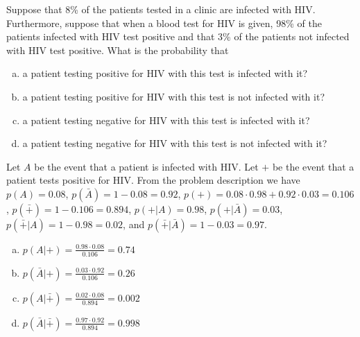 \documentclass[../main.tex]{subfiles}
\begin{document}
Suppose that 8\% of the patients tested in a clinic are infected with HIV.
Furthermore, suppose that when a blood test for HIV is given, 98\% of the patients infected with HIV test positive and that 3\% of the patients not infected with HIV test positive.
What is the probability that
\begin{enumerate}[a)]
	\item a patient testing positive for HIV with this test is infected with it?
	\item a patient testing positive for HIV with this test is not infected with it?
	\item a patient testing negative for HIV with this test is infected with it?
	\item a patient testing negative for HIV with this test is not infected with it?
\end{enumerate}

\solution
Let $A$ be the event that a patient is infected with HIV. Let $+$ be the event that a patient tests positive for HIV.
From the problem description we have $p(A) = 0.08$, $p(\bar{A}) = 1-0.08 = 0.92$, $p(+) = 0.08 \cdot 0.98 + 0.92
\cdot 0.03 = 0.106$, $p(\bar{+}) = 1-0.106 = 0.894$, $p(+|A) = 0.98$, $p(+|\bar{A}) = 0.03$, $p(\bar{+}|A) = 
1-0.98 = 0.02$, and $p(\bar{+}|\bar{A}) = 1-0.03 = 0.97$.  
\begin{enumerate}[a)]
	\item $p(A|+) = \frac{0.98 \cdot 0.08}{0.106} = 0.74$
	\item $p(\bar{A}|+) = \frac{0.03 \cdot 0.92}{0.106} = 0.26$
	\item $p(A|\bar{+}) = \frac{0.02 \cdot 0.08}{0.894} = 0.002$
	\item $p(\bar{A}|\bar{+}) = \frac{0.97 \cdot 0.92}{0.894} = 0.998$
\end{enumerate}
\end{document}
